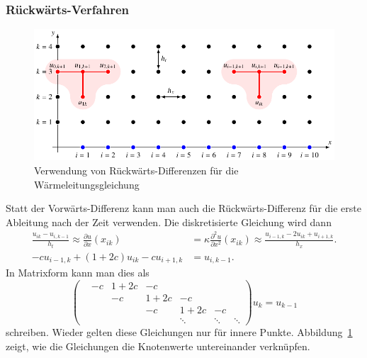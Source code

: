 \subsubsection{Rückwärts-Verfahren}
\begin{figure}
\centering
\includegraphics{chapters/70-pde/images/rueckwaerts.pdf}
\caption{Verwendung von Rückwärts-Differenzen für die Wärmeleitungsgleichung
\label{buch:pde:figure:rueckwaerts}}
\end{figure}
Statt der Vorwärts-Differenz kann man auch die Rückwärts-Differenz für
die erste Ableitung nach der Zeit verwenden.
Die diskretisierte Gleichung wird dann
\begin{align*}
\frac{u_{ik}-u_{i,k-1}}{h_t}
\approx
\frac{\partial u}{\partial x}(x_{ik})
&=
\kappa\frac{\partial^2 u}{\partial x^2}(x_{ik})
\approx
\frac{u_{i-1,k}-2u_{ik} + u_{i+1,k}}{h_x}.
\\
-cu_{i-1,k}
+
(1+2c)u_{ik}
-cu_{i+1,k}
&=u_{i,k-1}.
\end{align*}
In Matrixform kann man dies als
\[
\begin{pmatrix}
      &    -c&  1+2c& -c &      &      &      \\
      &      &   -c &1+2c& -c   &      &      \\
      &      &      & -c &1+2c  & -c   &      \\
      &      &      &    &\ddots&\ddots&\ddots
\end{pmatrix}
u_k
=
u_{k-1}
\]
schreiben.
Wieder gelten diese Gleichungen nur für innere Punkte.
Abbildung~\ref{buch:pde:figure:rueckwaerts} zeigt, wie die Gleichungen
die Knotenwerte untereinander verknüpfen.


